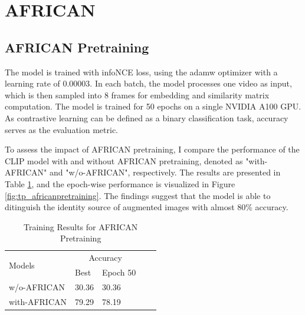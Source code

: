 






\section{AFRICAN}
\subsection{AFRICAN Pretraining}
The model is trained with infoNCE \parencite{oord2019representation} loss, using the adamw optimizer with a learning rate of 0.00003. In each batch, the model processes one video as input, which is then sampled into 8 frames for embedding and similarity matrix computation. The model is trained for 50 epochs on a single NVIDIA A100 GPU. As contrastive learning can be defined as a binary classification task, accuracy serves as the evaluation metric.

To assess the impact of AFRICAN pretraining, I compare the performance of the CLIP model with and without AFRICAN pretraining, denoted as "with-AFRICAN" and "w/o-AFRICAN", respectively. The results are presented in Table \ref{tab:africanpretrainingresults}, and the epoch-wise performance is visualized in Figure \ref{fig:tp_africanpretraining}. The findings suggest that the model is able to ditinguish the identity source of augmented images with almost 80\% accuracy. 

\begin{table}[ht]
    \centering
    \caption{Training Results for AFRICAN Pretraining}
    \label{tab:africanpretrainingresults}
    \begin{tabular}{lllll}
        \toprule
        \multirow{2}{*}{Models} & \multicolumn{2}{c}{Accuracy} \\
        \cmidrule{2-3} 
        {} &  Best & Epoch 50\\
        \midrule
        w/o-AFRICAN   & 30.36 & 30.36 \\
        with-AFRICAN  & 79.29 & 78.19 \\
        \bottomrule
    \end{tabular}
\end{table}

